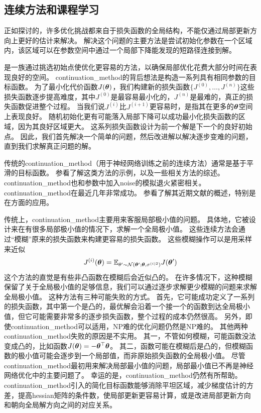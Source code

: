 
\subsection{连续方法和课程学习}
\label{sec:continuation_methods_and_curriculum_learning}
正如探讨的，许多优化挑战都来自于损失函数的全局结构，不能仅通过局部更新方向上更好的估计来解决。
解决这个问题的主要方法是尝试初始化参数在一个区域内，该区域可以在参数空间中通过一个局部下降能发现的短路径连接到解。

是一族通过挑选初始点使优化更容易的方法，以确保局部优化花费大部分时间在表现良好的空间。
\gls{continuation_method}的背后想法是构造一系列具有相同参数的目标函数。
为了最小化代价函数$J(\boldsymbol{\theta})$，我们构建新的损失函数$\{J^{(0)},\dots,J^{(n)}\}$这些损失函数逐步提高难度，其中$J^{(0)}$是最容易最小化的，$J^{(n)}$是最难的，真正的损失函数促进整个过程。
当我们说$J^{(i)}$比$J^{(i+1)}$更容易时，是指其在更多的$\boldsymbol{\theta}$空间上表现良好。
随机初始化更有可能落入局部下降可以成功最小化损失函数的区域，因为其良好区域更大。
这系列损失函数设计为前一个解是下一个的良好初始点。
因此，我们首先解决一个简单的问题，然后改进解以解决逐步变难的问题，直到我们求解真正问题的解。

传统的\gls{continuation_method}（用于神经网络训练之前的连续方法）通常是基于平滑的目标函数。
参看\cite{Wu-97}了解这类方法的示例，以及一些相关方法的综述。
\gls{continuation_method}也和参数中加入\gls{noise}的模拟退火紧密相关\citep{Kirkpatrick83}。
\gls{continuation_method}在最近几年非常成功。
参看\cite{Mobahi+Fisher-AAAI2015}了解其近期文献的概述，特别是在方面的应用。


传统上，\gls{continuation_method}主要用来客服局部极小值的问题。
具体地，它被设计来在有很多局部极小值的情况下，求解一个全局极小值。
这些连续方法会通过``模糊''原来的损失函数来构建更容易的损失函数。
这些模糊操作可以是用采样来近似
\begin{equation}
    J^{(i)}(\boldsymbol{\theta}) = \mathbb{E}_{\theta' \sim \mathcal{N}(\boldsymbol{\theta}'; \boldsymbol{\theta}, \sigma^{(i)2})} J(\boldsymbol{\theta}')
\end{equation}
这个方法的直觉是有些非凸函数在模糊后会近似凸的。
在许多情况下，这种模糊保留了关于全局极小值的足够信息，我们可以通过逐步求解更少模糊的问题来求解全局极小值。
这种方法有三种可能失败的方式。
首先，它可能成功定义了一系列的损失函数，其中第一个是凸的，最优解会沿着一个接一个的函数到达全局极小值，但它可能需要非常多的逐步损失函数，整个过程的成本仍然很高。
另外，即使\gls{continuation_method}可以适用，NP难的优化问题仍然是NP难的。
其他两种\gls{continuation_method}失败的原因是不实用。
其一，不管如何模糊，可能函数没法变成凸的，比如函数$J(\boldsymbol{\theta}) = -\boldsymbol{\theta}^\top \boldsymbol{\theta}$。
其二，函数可能在模糊后是凸的，但模糊函数的极小值可能会逐步到一个局部值，而非原始损失函数的全局极小值。
尽管\gls{continuation_method}最初用来解决局部最小值的问题，局部最小值已不再是神经网络优化中的主要问题了。
幸运的是，\gls{continuation_method}仍然有所帮助。
\gls{continuation_method}引入的简化目标函数能够消除平坦区域，减少梯度估计的方差，提高\gls{hessian}矩阵的条件数，使局部更新更容易计算，或是改进局部更新方向和朝向全局解方向之间的对应关系。

